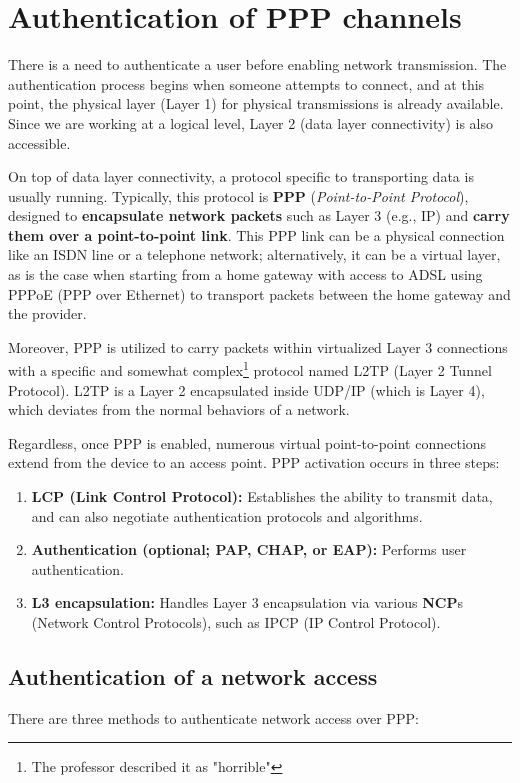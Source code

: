 \section{Authentication of PPP channels}
There is a need to authenticate a user before enabling network transmission. The authentication process begins when someone attempts to connect, and at this point, the physical layer (Layer 1) for physical transmissions is already available. Since we are working at a logical level, Layer 2 (data layer connectivity) is also accessible.

On top of data layer connectivity, a protocol specific to transporting data is usually running. Typically, this protocol is \textbf{PPP} (\textit{Point-to-Point Protocol}), designed to \textbf{encapsulate network packets} such as Layer 3 (e.g., IP) and \textbf{carry them over a point-to-point link}. This PPP link can be a physical connection like an ISDN line or a telephone network; alternatively, it can be a virtual layer, as is the case when starting from a home gateway with access to ADSL using PPPoE (PPP over Ethernet) to transport packets between the home gateway and the provider.

Moreover, PPP is utilized to carry packets within virtualized Layer 3 connections with a specific and somewhat complex\footnote{The professor described it as "horrible"} protocol named L2TP (Layer 2 Tunnel Protocol). L2TP is a Layer 2 encapsulated inside UDP/IP (which is Layer 4), which deviates from the normal behaviors of a network.

Regardless, once PPP is enabled, numerous virtual point-to-point connections extend from the device to an access point. PPP activation occurs in three steps:

\begin{enumerate}
	\item \textbf{LCP (Link Control Protocol):} Establishes the ability to transmit data, and can also negotiate authentication protocols and algorithms.
	\item \textbf{Authentication (optional; PAP, CHAP, or EAP):} Performs user authentication.
	\item \textbf{L3 encapsulation:} Handles Layer 3 encapsulation via various \textbf{NCP}s (Network Control Protocols), such as IPCP (IP Control Protocol).
\end{enumerate}




\subsection{Authentication of a network access}
There are three methods to authenticate network access over PPP:


